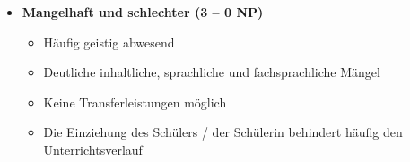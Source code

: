 {\begin{multicols}{2}
\begin{itemize}[label={}]
\item \textbf{Mangelhaft und schlechter (3 -- 0 NP)}
\begin{itemize}
	\item Häufig geistig abwesend
	\item Deutliche inhaltliche, sprachliche und fachsprachliche Mängel
	\item Keine Transferleistungen möglich
	\item Die Einziehung des Schülers / der Schülerin behindert häufig den Unterrichtsverlauf
\end{itemize}
\end{itemize}

\end{multicols}
}